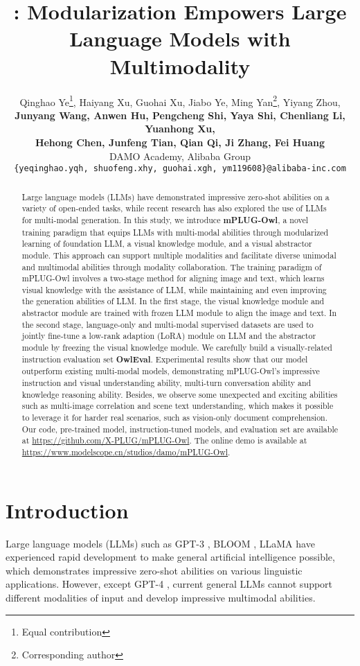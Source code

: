 \documentclass{article}
\title{\titledmodelname: Modularization Empowers Large Language Models with Multimodality}
\author{Qinghao Ye\thanks{Equal contribution}\hspace{1.5mm}, Haiyang Xu, Guohai Xu, Jiabo Ye, Ming Yan\thanks{Corresponding author}, Yiyang Zhou, \\ \textbf{Junyang Wang, Anwen Hu, Pengcheng Shi, Yaya Shi, Chenliang Li, Yuanhong Xu,} \\ \textbf{Hehong Chen, Junfeng Tian, Qian Qi, Ji Zhang, Fei Huang} \\
DAMO Academy, Alibaba Group \\
{\small \texttt{\{yeqinghao.yqh, shuofeng.xhy, guohai.xgh, ym119608\}@alibaba-inc.com}} 
}
\newcommand{\modelname}{mPLUG-Owl\xspace}
\newcommand{\evalsetname}{OwlEval\xspace}
\begin{document}
\maketitle

\begin{abstract}
Large language models (LLMs) have demonstrated impressive zero-shot abilities on a variety of open-ended tasks, while recent research has also explored the use of LLMs for multi-modal generation. In this study, we introduce \textbf{\modelname}, a novel training paradigm that equips LLMs with multi-modal abilities through modularized learning of foundation LLM, a visual knowledge module, and a visual abstractor module. This approach can support multiple modalities and facilitate diverse unimodal and multimodal abilities through modality collaboration. The training paradigm of \modelname involves a two-stage method for aligning image and text, which learns visual knowledge with the assistance of LLM, while maintaining and even improving the generation abilities of LLM. In the first stage, the visual knowledge module and abstractor module are trained with frozen LLM module to align the image and text. In the second stage, language-only and multi-modal supervised datasets are used to jointly fine-tune a low-rank adaption (LoRA) module on LLM and the abstractor module by freezing the visual knowledge module. We carefully build a visually-related instruction evaluation set \textbf{\evalsetname}. Experimental results show that our model outperform existing multi-modal models,  demonstrating \modelname's impressive instruction and visual understanding ability, multi-turn conversation ability and knowledge reasoning ability. Besides, we observe some unexpected and exciting abilities such as multi-image correlation and scene text understanding, which makes it possible to leverage it for harder real scenarios, such as vision-only document comprehension.
Our code, pre-trained model,  instruction-tuned models, and evaluation set are available at \href{https://github.com/X-PLUG/mPLUG-Owl}{https://github.com/X-PLUG/mPLUG-Owl}. The online demo is available at \href{https://www.modelscope.cn/studios/damo/mPLUG-Owl/}{https://www.modelscope.cn/studios/damo/mPLUG-Owl}.
\end{abstract}



\section{Introduction}
Large language models (LLMs) such as GPT-3 \citep{gpt3}, BLOOM \citep{bloom}, LLaMA \citep{llama} have experienced rapid development to make general artificial intelligence possible, which demonstrates impressive zero-shot abilities on various linguistic applications. However, except GPT-4 \citep{gpt4}, current general LLMs cannot support different modalities of input and develop impressive multimodal abilities. 
\end{document}
